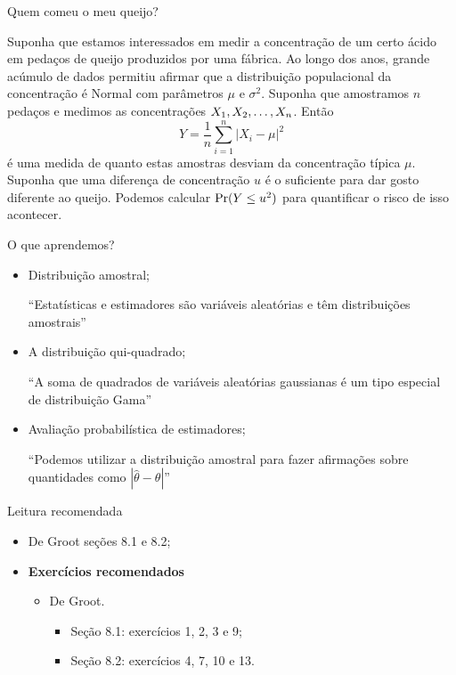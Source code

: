 \begin{frame}{Quem comeu o meu queijo?}
 \begin{exemplo}
  Suponha que estamos interessados em medir a concentração de um certo ácido em pedaços de queijo produzidos por uma fábrica.
  Ao longo dos anos, grande acúmulo de dados permitiu afirmar que a distribuição populacional da concentração é Normal com parâmetros $\mu$ e $\sigma^2$.
  Suponha que amostramos $n$ pedaços e medimos as concentrações $X_1, X_2, \ldots, X_n$.
  Então 
  \[ Y = \frac{1}{n}\sum_{i=1}^n |X_i-\mu|^2 \]
é uma medida de quanto estas amostras desviam da concentração típica $\mu$.
Suponha que uma diferença de concentração $u$ é o suficiente para dar gosto diferente ao queijo.
Podemos calcular $\operatorname{Pr}(Y \leq u^2)$ para quantificar o risco de isso acontecer.
 \end{exemplo}

\end{frame}

\begin{frame}{O que aprendemos?}
\begin{itemize}

  \item[\faLightbulbO] Distribuição amostral;    
  
   ``Estatísticas e estimadores são variáveis aleatórias e têm distribuições amostrais''
  
  \item[\faLightbulbO] A distribuição qui-quadrado;
  
  ``A soma de quadrados de variáveis aleatórias gaussianas é um tipo especial de distribuição Gama''
  
  \item[\faLightbulbO] Avaliação probabilística de estimadores;
  
  ``Podemos utilizar a distribuição amostral para fazer afirmações sobre quantidades como $|\hat{\theta}-\theta|$''
  
  \end{itemize}
 \end{frame}

\begin{frame}{Leitura recomendada}
\begin{itemize}
 \item[\faBook] De Groot seções 8.1 e 8.2;
 \item {\large\textbf{Exercícios recomendados}}
 \begin{itemize}
  \item[\faBookmark] De Groot.
  \begin{itemize}
   \item Seção 8.1: exercícios 1, 2, 3 e 9;
   \item Seção 8.2: exercícios 4, 7, 10 e 13.
  \end{itemize}   
  \end{itemize}
 \end{itemize} 
\end{frame}
